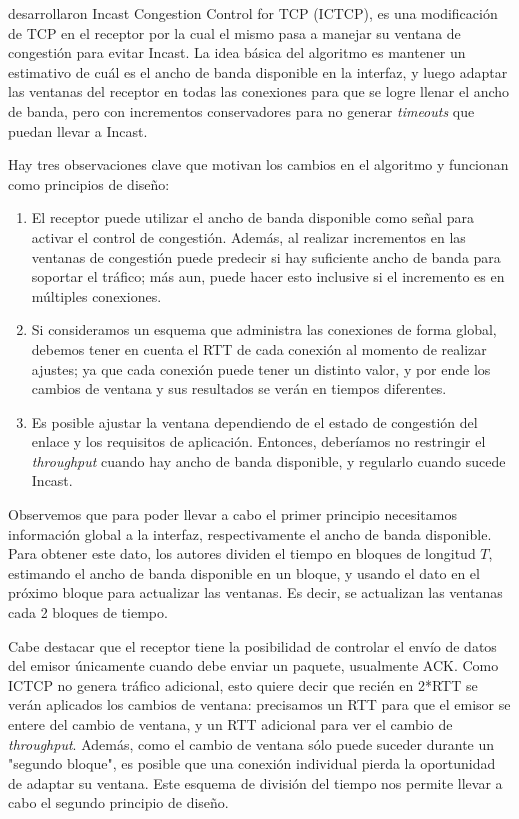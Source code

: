 \documentclass[runningheads,a4paper]{llncs}
\begin{document}
\citet{Wu_ICTCP_2010} desarrollaron Incast Congestion Control for TCP (ICTCP), es una modificación de TCP en el receptor por la cual el mismo pasa a manejar su ventana de congestión para evitar Incast. La idea básica del algoritmo es mantener un estimativo de cuál es el ancho de banda disponible en la interfaz, y luego adaptar las ventanas del receptor en todas las conexiones para que se logre llenar el ancho de banda, pero con incrementos conservadores para no generar \textit{timeouts} que puedan llevar a Incast.

Hay tres observaciones clave que motivan los cambios en el algoritmo y funcionan como principios de diseño:

\begin{enumerate}
    \item El receptor puede utilizar el ancho de banda disponible como señal para activar el control de congestión. Además, al realizar incrementos en las ventanas de congestión puede predecir si hay suficiente ancho de banda para soportar el tráfico; más aun, puede hacer esto inclusive si el incremento es en múltiples conexiones.
    
    \item Si consideramos un esquema que administra las conexiones de forma global, debemos tener en cuenta el RTT de cada conexión al momento de realizar ajustes; ya que cada conexión puede tener un distinto valor, y por ende los cambios de ventana y sus resultados se verán en tiempos diferentes.
    
    \item Es posible ajustar la ventana dependiendo de el estado de congestión del enlace y los requisitos de aplicación. Entonces, deberíamos no restringir el \textit{throughput} cuando hay ancho de banda disponible, y regularlo cuando sucede Incast.
\end{enumerate}

Observemos que para poder llevar a cabo el primer principio necesitamos información global a la interfaz, respectivamente el ancho de banda disponible. Para obtener este dato, los autores dividen el tiempo en bloques de longitud $T$, estimando el ancho de banda disponible en un bloque, y usando el dato en el próximo bloque para actualizar las ventanas. Es decir, se actualizan las ventanas cada 2 bloques de tiempo.

Cabe destacar que el receptor tiene la posibilidad de controlar el envío de datos del emisor únicamente cuando debe enviar un paquete, usualmente ACK. Como ICTCP no genera tráfico adicional, esto quiere decir que recién en 2*RTT se verán aplicados los cambios de ventana: precisamos un RTT para que el emisor se entere del cambio de ventana, y un RTT adicional para ver el cambio de \textit{throughput}. Además, como el cambio de ventana sólo puede suceder durante un "segundo bloque", es posible que una conexión individual pierda la oportunidad de adaptar su ventana. Este esquema de división del tiempo nos permite llevar a cabo el segundo principio de diseño.
\end{document}
